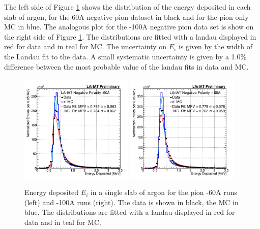 The left side of Figure \ref{fig:EnergyDeposited} shows the distribution of the energy deposited in each slab of argon, for the 60A negative pion dataset in black and for the pion only MC in blue. The analogous plot for the -100A negative pion data set  is show on the right side of Figure \ref{fig:EnergyDeposited}.  The distributions are fitted with a landau displayed in red for data and in teal for MC.
The uncertainty on $E_{i}$ is given by the width of the Landau fit to the data. A small systematic uncertainty  is given by a 1.0\% difference between the most probable value of the landau fits in data and MC.

\begin{figure}[htb]
\centering
\includegraphics[width=0.48\textwidth]{Chapter-5/Images/DepEnergy_Fit_v4.png}
\includegraphics[width=0.48\textwidth]{Chapter-5/Images/DepEnergy_Fit_v4100A.png}
\caption[]{ Energy deposited  $E_{i}$ in a single slab of argon for the pion -60A runs (left) and -100A runs (right).  The data is shown in black, the MC in blue. The distributions are fitted with a landau displayed in red for data and in teal for MC. } \label{fig:EnergyDeposited}
\end{figure}

